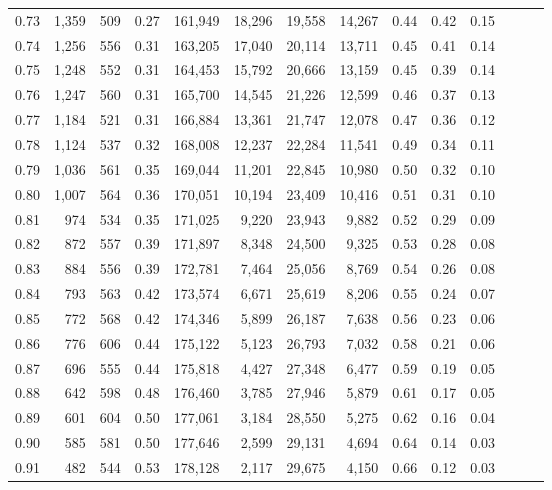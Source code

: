 \begin{tabular}{rrrrrrrrrrrrrr}
0.73 &  1,359 &  509 &  0.27 &  161,949 &   18,296 &  19,558 &  14,267 &  0.44 &  0.42 &      0.15 \\
0.74 &  1,256 &  556 &  0.31 &  163,205 &   17,040 &  20,114 &  13,711 &  0.45 &  0.41 &      0.14 \\
0.75 &  1,248 &  552 &  0.31 &  164,453 &   15,792 &  20,666 &  13,159 &  0.45 &  0.39 &      0.14 \\
0.76 &  1,247 &  560 &  0.31 &  165,700 &   14,545 &  21,226 &  12,599 &  0.46 &  0.37 &      0.13 \\
0.77 &  1,184 &  521 &  0.31 &  166,884 &   13,361 &  21,747 &  12,078 &  0.47 &  0.36 &      0.12 \\
0.78 &  1,124 &  537 &  0.32 &  168,008 &   12,237 &  22,284 &  11,541 &  0.49 &  0.34 &      0.11 \\
0.79 &  1,036 &  561 &  0.35 &  169,044 &   11,201 &  22,845 &  10,980 &  0.50 &  0.32 &      0.10 \\
0.80 &  1,007 &  564 &  0.36 &  170,051 &   10,194 &  23,409 &  10,416 &  0.51 &  0.31 &      0.10 \\
0.81 &    974 &  534 &  0.35 &  171,025 &    9,220 &  23,943 &   9,882 &  0.52 &  0.29 &      0.09 \\
0.82 &    872 &  557 &  0.39 &  171,897 &    8,348 &  24,500 &   9,325 &  0.53 &  0.28 &      0.08 \\
0.83 &    884 &  556 &  0.39 &  172,781 &    7,464 &  25,056 &   8,769 &  0.54 &  0.26 &      0.08 \\
0.84 &    793 &  563 &  0.42 &  173,574 &    6,671 &  25,619 &   8,206 &  0.55 &  0.24 &      0.07 \\
0.85 &    772 &  568 &  0.42 &  174,346 &    5,899 &  26,187 &   7,638 &  0.56 &  0.23 &      0.06 \\
0.86 &    776 &  606 &  0.44 &  175,122 &    5,123 &  26,793 &   7,032 &  0.58 &  0.21 &      0.06 \\
0.87 &    696 &  555 &  0.44 &  175,818 &    4,427 &  27,348 &   6,477 &  0.59 &  0.19 &      0.05 \\
0.88 &    642 &  598 &  0.48 &  176,460 &    3,785 &  27,946 &   5,879 &  0.61 &  0.17 &      0.05 \\
0.89 &    601 &  604 &  0.50 &  177,061 &    3,184 &  28,550 &   5,275 &  0.62 &  0.16 &      0.04 \\
0.90 &    585 &  581 &  0.50 &  177,646 &    2,599 &  29,131 &   4,694 &  0.64 &  0.14 &      0.03 \\
0.91 &    482 &  544 &  0.53 &  178,128 &    2,117 &  29,675 &   4,150 &  0.66 &  0.12 &      0.03 \\

\end{tabular}
